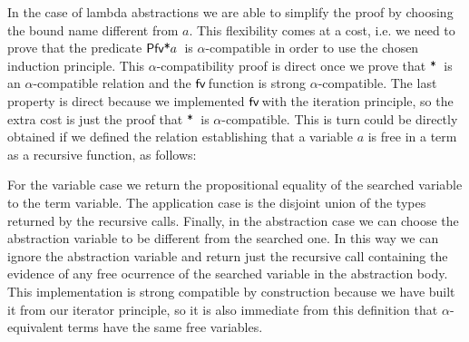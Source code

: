 \documentclass{entcs}
\newcommand{\alp}{\ensuremath{\alpha}}
\newcommand{\lambAg}[2]{\ensuremath{\AgdaInductiveConstructor{ƛ}\, #1\, #2}}
\newcommand{\inAg}{\ensuremath{\mathbin{\AgdaFunction{∈}}}}
\newcommand{\neqAg}{\ensuremath{\mathbin{\AgdaInductiveConstructor{≢}}}}
\newcommand{\fv}{\ensuremath{{\AgdaFunction{fv}}\,}}
\newcommand{\perm}{\ensuremath{\mathbin{\AgdaFunction{∙}}}}
\newcommand{\free}{\ensuremath{\mathbin{\AgdaFunction{*}}}}
\newcommand{\choiceAg}{\ensuremath{\AgdaFunction{χ}\,}}
\begin{document}
\noindent In the  case of lambda abstractions we are able to simplify the proof by choosing the bound name different from $a$. 
This flexibility comes at a cost, i.e. we need to prove that the predicate $\AgdaFunction{Pfv*} a$\ is \alp-compatible in order to use the chosen induction principle. This \alp-compatibility proof is direct once we prove that \free\ is an \alp-compatible relation and the \fv function is strong \alp-compatible. The last property is direct because we implemented \fv with the iteration principle, so the extra cost is just the proof that \free\ is \alp-compatible. This is turn could be directly obtained if we defined the relation establishing that a variable $a$ is free in a term as a recursive function, as follows:

 \hspace{5px}

\noindent For the variable case we return the propositional equality of the searched variable to the term variable. The application case is the disjoint union of the types returned by the recursive calls. Finally, in the abstraction case we can choose the abstraction variable to be different from the searched one. In this way we can ignore the abstraction variable and return just the recursive call containing the evidence of any free ocurrence of the searched variable in the abstraction body. 
This implementation is strong compatible by construction because we have built it from our iterator principle, so it is also immediate from this definition that $\alpha$-equivalent terms have the same free variables.
\end{document}
